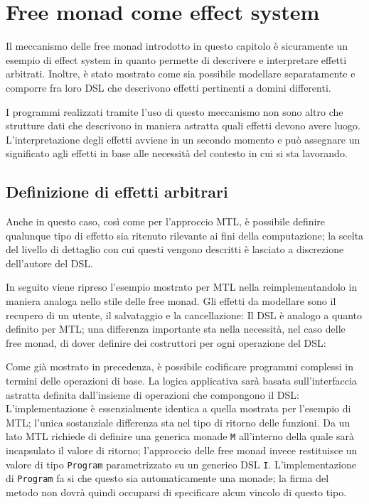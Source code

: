 \section{Free monad come effect system}
Il meccanismo delle free monad introdotto in questo capitolo è sicuramente un esempio di effect system in quanto permette di descrivere e interpretare effetti arbitrati. Inoltre, è stato mostrato come sia possibile modellare separatamente e comporre fra loro DSL che descrivono effetti pertinenti a domini differenti.

I programmi realizzati tramite l'uso di questo meccanismo non sono altro che strutture dati che descrivono in maniera astratta quali effetti devono avere luogo. L'interpretazione degli effetti avviene in un secondo momento e può assegnare un significato agli effetti in base alle necessità del contesto in cui si sta lavorando.

\subsection{Definizione di effetti arbitrari}
Anche in questo caso, così come per l'approccio MTL, è possibile definire qualunque tipo di effetto sia ritenuto rilevante ai fini della computazione; la scelta del livello di dettaglio con cui questi vengono descritti è lasciato a discrezione dell'autore del DSL. 

In seguito viene ripreso l'esempio mostrato per MTL nella  reimplementandolo in maniera analoga nello stile delle free monad. Gli effetti da modellare sono il recupero di un utente, il salvataggio e la cancellazione:
Il DSL è analogo a quanto definito per MTL; una differenza importante sta nella necessità, nel caso delle free monad, di dover definire dei costruttori per ogni operazione del DSL:

Come già mostrato in precedenza, è possibile codificare programmi complessi in termini delle operazioni di base. La logica applicativa sarà basata sull'interfaccia astratta definita dall'insieme di operazioni che compongono il DSL:
L'implementazione è essenzialmente identica a quella mostrata per l'esempio di MTL; l'unica sostanziale differenza sta nel tipo di ritorno delle funzioni. Da un lato MTL richiede di definire una generica monade \lstinline{M} all'interno della quale sarà incapsulato il valore di ritorno; l'approccio delle free monad invece restituisce un valore di tipo \lstinline{Program} parametrizzato su un generico DSL \lstinline{I}.
L'implementazione di \lstinline{Program} fa si che questo sia automaticamente una monade; la firma del metodo non dovrà quindi occuparsi di specificare alcun vincolo di questo tipo.

